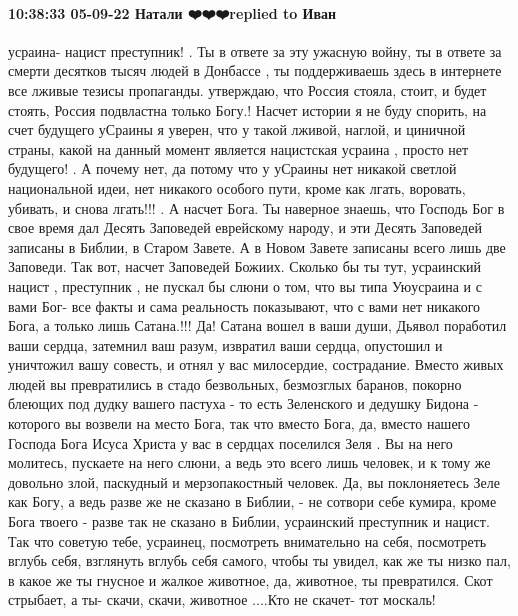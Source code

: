  
 
 
 
 

\paragraph{10:38:33 05-09-22 Натали ❤️❤️❤️replied to Иван}

усраина- нацист преступник! . Ты в ответе за эту ужасную войну, ты в ответе за
смерти десятков тысяч людей в Донбассе , ты поддерживаешь здесь в интернете все
лживые тезисы пропаганды. утверждаю, что Россия стояла, стоит, и будет стоять,
Россия подвластна только Богу.! Насчет истории я не буду спорить, на счет
будущего уСраины я уверен, что у такой лживой, наглой, и циничной страны, какой
на данный момент является нацистская усраина , просто нет будущего! . А почему
нет, да потому что у уСраины нет никакой светлой национальной идеи, нет
никакого особого пути, кроме как лгать, воровать, убивать, и снова лгать!!! . А
насчет Бога. Ты наверное знаешь, что Господь Бог в свое время дал Десять
Заповедей еврейскому народу, и эти Десять Заповедей записаны в Библии, в Старом
Завете. А в Новом Завете записаны всего лишь две Заповеди. Так вот, насчет
Заповедей Божиих. Сколько бы ты тут, усраинский нацист , преступник , не пускал
бы слюни о том, что вы типа Уюусраина и с вами Бог- все факты и сама реальность
показывают, что с вами нет никакого Бога, а только лишь Сатана.!!! Да! Сатана
вошел в ваши души, Дьявол поработил ваши сердца, затемнил ваш разум, извратил
ваши сердца, опустошил и уничтожил вашу совесть, и отнял у вас милосердие,
сострадание. Вместо живых людей вы превратились в стадо безвольных, безмозглых
баранов, покорно блеющих под дудку вашего пастуха - то есть Зеленского и
дедушку Бидона - которого вы возвели на место Бога, так что вместо Бога, да,
вместо нашего Господа Бога Исуса Христа у вас в сердцах поселился Зеля . Вы на
него молитесь, пускаете на него слюни, а ведь это всего лишь человек, и к тому
же довольно злой, паскудный и мерзопакостный человек.  Да, вы поклоняетесь Зеле
как Богу, а ведь разве же не сказано в Библии, - не сотвори себе кумира, кроме
Бога твоего - разве так не сказано в Библии, усраинский преступник и нацист.
Так что советую тебе, усраинец, посмотреть внимательно на себя, посмотреть
вглубь себя, взглянуть вглубь себя самого, чтобы ты увидел, как же ты низко
пал, в какое же ты гнусное и жалкое животное, да, животное, ты превратился.
Скот стрыбает, а ты- скачи, скачи, животное ....Кто не скачет- тот москаль!
